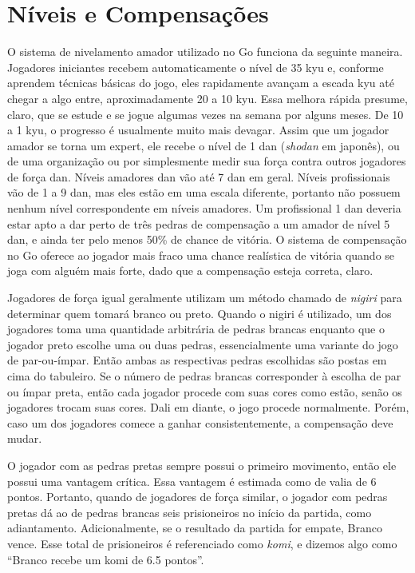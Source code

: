 \chapter{Níveis e Compensações}\label{chap:10:niveis_compensacoes}

O sistema de nivelamento amador utilizado no Go funciona da seguinte maneira. Jogadores iniciantes recebem automaticamente o nível de 35 kyu e, conforme aprendem técnicas básicas do jogo, eles rapidamente avançam a escada kyu até chegar a algo entre, aproximadamente 20 a 10 kyu. Essa melhora rápida presume, claro, que se estude e se jogue algumas vezes na semana por alguns meses. De 10 a 1 kyu, o progresso é usualmente muito mais devagar. Assim que um jogador amador se torna um expert, ele recebe o nível de 1 dan (\emph{shodan} em japonês), ou de uma organização ou por simplesmente medir sua força contra outros jogadores de força dan. Níveis amadores dan vão até 7 dan em geral. Níveis profissionais vão de 1 a 9 dan, mas eles estão em uma escala diferente, portanto não possuem nenhum nível correspondente em níveis amadores. Um profissional 1 dan deveria estar apto a dar perto de três pedras de compensação a um amador de nível 5 dan, e ainda ter pelo menos 50\% de chance de vitória. O sistema de compensação no Go oferece ao jogador mais fraco uma chance realística de vitória quando se joga com alguém mais forte, dado que a compensação esteja correta, claro.

Jogadores de força igual geralmente utilizam um método chamado de \emph{nigiri} para determinar quem tomará branco ou preto. Quando o nigiri é utilizado, um dos jogadores toma uma quantidade arbitrária de pedras brancas enquanto que o jogador preto escolhe uma ou duas pedras, essencialmente uma variante do jogo de par-ou-ímpar. Então ambas as respectivas pedras escolhidas são postas em cima do tabuleiro. Se o número de pedras brancas corresponder à escolha de par ou ímpar preta, então cada jogador procede com suas cores como estão, senão os jogadores trocam suas cores. Dali em diante, o jogo procede normalmente. Porém, caso um dos jogadores comece a ganhar consistentemente, a compensação deve mudar.

O jogador com as pedras pretas sempre possui o primeiro movimento, então ele possui uma vantagem crítica. Essa vantagem é estimada como de valia de 6 pontos. Portanto, quando de jogadores de força similar, o jogador com pedras pretas dá ao de pedras brancas seis prisioneiros no início da partida, como adiantamento. Adicionalmente, se o resultado da partida for empate, Branco vence. Esse total de prisioneiros é referenciado como \emph{komi}, e dizemos algo como ``Branco recebe um komi de 6.5 pontos''.

